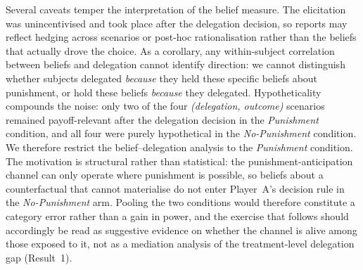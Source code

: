 Several caveats temper the interpretation of the belief measure. The elicitation was unincentivised and took place after the delegation decision, so reports may reflect hedging across scenarios or post-hoc rationalisation rather than the beliefs that actually drove the choice. As a corollary, any within-subject correlation between beliefs and delegation cannot identify direction: we cannot distinguish whether subjects delegated \textit{because} they held these specific beliefs about punishment, or hold these beliefs \textit{because} they delegated. Hypotheticality compounds the noise: only two of the four \textit{(delegation, outcome)} scenarios remained payoff-relevant after the delegation decision in the \textit{Punishment} condition, and all four were purely hypothetical in the \textit{No-Punishment} condition. We therefore restrict the belief--delegation analysis to the \textit{Punishment} condition. The motivation is structural rather than statistical: the punishment-anticipation channel can only operate where punishment is possible, so beliefs about a counterfactual that cannot materialise do not enter Player~A's decision rule in the \textit{No-Punishment} arm. Pooling the two conditions would therefore constitute a category error rather than a gain in power, and the exercise that follows should accordingly be read as suggestive evidence on whether the channel is alive among those exposed to it, not as a mediation analysis of the treatment-level delegation gap (Result~1).
